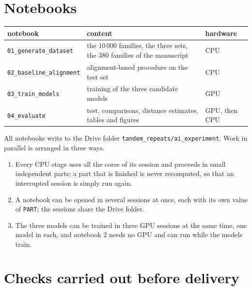 \documentclass[11pt,a4paper]{article}
\begin{document}
\section{Notebooks}

\begin{center}
\begin{tabular}{lll}
\toprule
notebook & content & hardware \\
\midrule
\texttt{01\_generate\_dataset} & the 10\,000 families, the three sets, the 380 families of the manuscript & CPU \\
\texttt{02\_baseline\_alignment} & alignment-based procedure on the test set & CPU \\
\texttt{03\_train\_models} & training of the three candidate models & GPU \\
\texttt{04\_evaluate} & test, comparisons, distance estimates, tables and figures & GPU, then CPU \\
\bottomrule
\end{tabular}
\end{center}

All notebooks write to the Drive folder \texttt{tandem\_repeats/ai\_experiment}. Work in parallel is arranged in three ways.
\begin{enumerate}
\item Every CPU stage uses all the cores of its session and proceeds in small independent parts; a part that is finished is never recomputed, so that an interrupted session is simply run again.
\item A notebook can be opened in several sessions at once, each with its own value of \texttt{PART}; the sessions share the Drive folder.
\item The three models can be trained in three GPU sessions at the same time, one model in each, and notebook 2 needs no GPU and can run while the models train.
\end{enumerate}

\section{Checks carried out before delivery}
\end{document}
